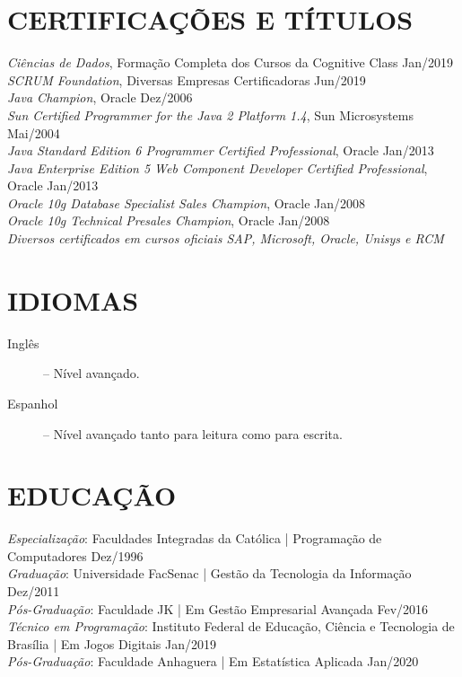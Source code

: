 \documentclass{res}
\begin{document}
\begin{resume}
		\section{CERTIFICAÇÕES E TÍTULOS}
		\vspace{8pt}
		{\sl Ciências de Dados}, Formação Completa dos Cursos da Cognitive Class \hfill Jan/2019 \\
		{\sl SCRUM Foundation}, Diversas Empresas Certificadoras \hfill Jun/2019 \\
		{\sl Java Champion}, Oracle \hfill Dez/2006 \\
		{\sl Sun Certified Programmer for the Java 2 Platform 1.4}, Sun Microsystems \hfill Mai/2004 \\
		{\sl Java Standard Edition 6 Programmer Certified Professional}, Oracle \hfill Jan/2013 \\
		{\sl Java Enterprise Edition 5 Web Component Developer Certified Professional}, Oracle \hfill Jan/2013 \\
		{\sl Oracle 10g Database Specialist Sales Champion}, Oracle \hfill Jan/2008 \\
		{\sl Oracle 10g Technical Presales Champion}, Oracle \hfill Jan/2008 \\
		{\sl Diversos certificados em cursos oficiais SAP, Microsoft, Oracle, Unisys e RCM}
		
		\section{IDIOMAS} 
		\vspace{18pt}
		\begin{description}
			\item[Inglês] -- Nível avançado.
			\item[Espanhol] -- Nível avançado tanto para leitura como para escrita.
		\end{description}
		
		\section{EDUCAÇÃO}
		\vspace{8pt} 
		{\sl Especialização}: Faculdades Integradas da Católica | Programação de Computadores 
		\hfill Dez/1996 \\
		{\sl Graduação}: Universidade FacSenac | Gestão da Tecnologia da Informação     
		\hfill Dez/2011 \\
		{\sl Pós-Graduação}: Faculdade JK | Em Gestão Empresarial Avançada 
		\hfill Fev/2016 \\
		{\sl Técnico em Programação}: Instituto Federal de Educação, Ciência e Tecnologia de Brasília | Em Jogos Digitais
		\hfill Jan/2019 \\
		{\sl Pós-Graduação}: Faculdade Anhaguera | Em Estatística Aplicada
		\hfill Jan/2020 \\
		

\end{resume}
\end{document}
